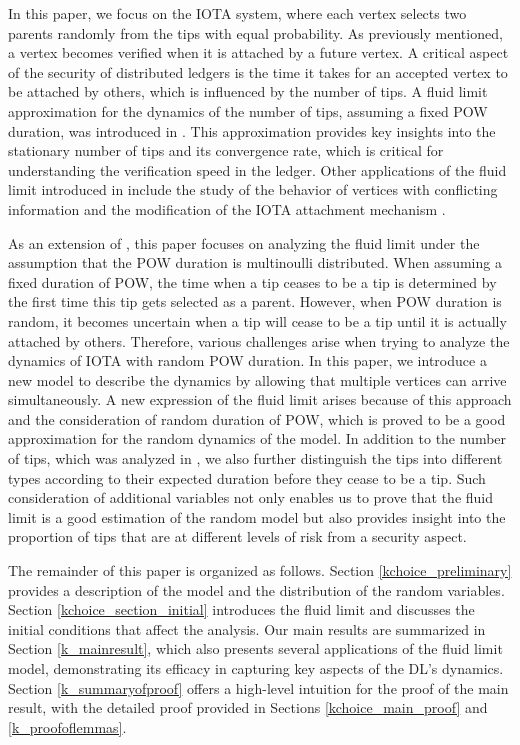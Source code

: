 \documentclass[12pt]{article}
\numberwithin{equation}{section}  %
\begin{document}
In this paper, we focus on the IOTA system, where each vertex selects two parents randomly from the tips with equal probability. As previously mentioned, a vertex becomes verified when it is attached by a future vertex. A critical aspect of the security of distributed ledgers is the time it takes for an accepted vertex to be attached by others, which is influenced by the number of tips. A fluid limit approximation for the dynamics of the number of tips, assuming a fixed POW duration, was introduced in \cite{Ck21}. This approximation provides key insights into the stationary number of tips and its convergence rate, which is critical for understanding the verification speed in the ledger. Other applications of the fluid limit introduced in \cite{Ck21} include the study of the behavior of vertices with conflicting information \cite{CK18} and the modification of the IOTA attachment mechanism \cite{Fer19}.

As an extension of \cite{Ck21}, this paper focuses on analyzing the fluid limit under the assumption that the POW duration is multinoulli distributed. When assuming a fixed duration of POW, the time when a tip ceases to be a tip is determined by the first time this tip gets selected as a parent. However, when POW duration is random, it becomes uncertain when a tip will cease to be a tip until it is actually attached by others. Therefore, various challenges arise when trying to analyze the dynamics of IOTA with random POW duration. In this paper, we introduce a new model to describe the dynamics by allowing that multiple vertices can arrive simultaneously. A new expression of the fluid limit arises because of this approach and the consideration of random duration of POW, which is proved to be a good approximation for the random dynamics of the model. In addition to the number of tips, which was analyzed in \cite{Ck21}, we also further distinguish the tips into different types according to their expected duration before they cease to be a tip. Such consideration of additional variables not only enables us to prove that the fluid limit is a good estimation of the random model but also provides insight into the proportion of tips that are at different levels of risk from a security aspect.

The remainder of this paper is organized as follows. Section \ref{kchoice_preliminary} provides a description of the model and the distribution of the random variables. Section \ref{kchoice_section_initial} introduces the fluid limit and discusses the initial conditions that affect the analysis. Our main results are summarized in Section \ref{k_mainresult}, which also presents several applications of the fluid limit model, demonstrating its efficacy in capturing key aspects of the DL's dynamics. Section \ref{k_summaryofproof} offers a high-level intuition for the proof of the main result, with the detailed proof provided in Sections \ref{kchoice_main_proof} and \ref{k_proofoflemmas}.
\end{document}
